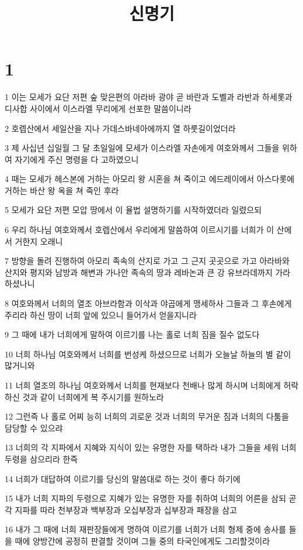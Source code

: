 

\title{신명기}


\chapter{1}

\par 1 이는 모세가 요단 저편 숲 맞은편의 아라바 광야 곧 바란과 도벨과 라반과 하세롯과 디사합 사이에서 이스라엘 무리에게 선포한 말씀이니라
\par 2 호렙산에서 세일산을 지나 가데스바네아에까지 열 하룻길이었더라
\par 3 제 사십년 십일월 그 달 초일일에 모세가 이스라엘 자손에게 여호와께서 그들을 위하여 자기에게 주신 명령을 다 고하였으니
\par 4 때는 모세가 헤스본에 거하는 아모리 왕 시혼을 쳐 죽이고 에드레이에서 아스다롯에 거하는 바산 왕 옥을 쳐 죽인 후라
\par 5 모세가 요단 저편 모압 땅에서 이 율법 설명하기를 시작하였더라 일렸으되
\par 6 우리 하나님 여호와께서 호렙산에서 우리에게 말씀하여 이르시기를 너희가 이 산에서 거한지 오래니
\par 7 방향을 돌려 진행하여 아모리 족속의 산지로 가고 그 근지 곳곳으로 가고 아라바와 산지와 평지와 남방과 해변과 가나안 족속의 땅과 레바논과 큰 강 유브라데까지 가라 하셨나니
\par 8 여호와께서 너희의 열조 아브라함과 이삭과 야곱에게 맹세하사 그들과 그 후손에게 주리라 하신 땅이 너희 앞에 있으니 들어가서 얻을지니라
\par 9 그 때에 내가 너희에게 말하여 이르기를 나는 홀로 너희 짐을 질수 없도다
\par 10 너희 하나님 여호와께서 너희를 번성케 하셨으므로 너희가 오늘날 하늘의 별 같이 많거니와
\par 11 너희 열조의 하나님 여호와께서 너희를 현재보다 천배나 많게 하시며 너희에게 허락하신 것과 같이 너희에게 복 주시기를 원하노라
\par 12 그런즉 나 홀로 어찌 능히 너희의 괴로운 것과 너희의 무거운 짐과 너희의 다툼을 담당할 수 있으랴
\par 13 너희의 각 지파에서 지혜와 지식이 있는 유명한 자를 택하라 내가 그들을 세워 너희 두령을 삼으리라 한즉
\par 14 너희가 대답하여 이르기를 당신의 말씀대로 하는 것이 좋다 하기에
\par 15 내가 너희 지파의 두령으로 지혜가 있는 유명한 자를 취하여 너희의 어른을 삼되 곧 각 지파를 따라 천부장과 백부장과 오십부장과 십부장과 패장을 삼고
\par 16 내가 그 때에 너희 재판장들에게 명하여 이르기를 너희가 너희 형제 중에 송사를 들을 때에 양방간에 공정히 판결할 것이며 그들 중의 타국인에게도 그리할것이라
